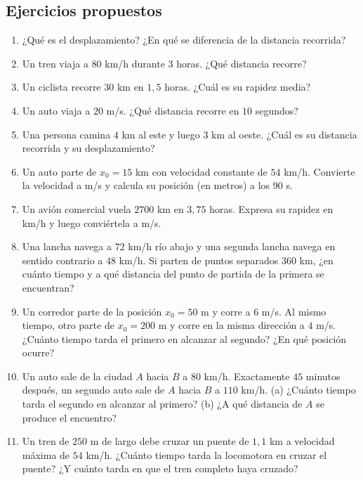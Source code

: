 \documentclass[12pt, letterpaper]{article}
\begin{document}
\subsection{Ejercicios propuestos}

\begin{enumerate}[leftmargin=*, resume]
  \item \facil{} ¿Qué es el desplazamiento? ¿En qué se diferencia de la distancia recorrida?

  \item \facil{} Un tren viaja a $80$ km/h durante $3$ horas. ¿Qué distancia recorre?

  \item \facil{} Un ciclista recorre $30$ km en $1{,}5$ horas. ¿Cuál es su rapidez media?

  \item \facil{} Un auto viaja a $20$ m/s. ¿Qué distancia recorre en $10$ segundos?

  \item \facil{} Una persona camina $4$ km al este y luego $3$ km al oeste. ¿Cuál es su distancia recorrida y su desplazamiento?

  \item \medio{} Un auto parte de $x_0 = 15$ km con velocidad constante de $54$ km/h. Convierte la velocidad a m/s y calcula su posición (en metros) a los $90$ s.

  \item \medio{} Un avión comercial vuela $2700$ km en $3{,}75$ horas. Expresa su rapidez en km/h y luego conviértela a m/s.

  \item \medio{} Una lancha navega a $72$ km/h río abajo y una segunda lancha navega en sentido contrario a $48$ km/h. Si parten de puntos separados $360$ km, ¿en cuánto tiempo y a qué distancia del punto de partida de la primera se encuentran?

  \item \medio{} Un corredor parte de la posición $x_0 = 50$ m y corre a $6$ m/s. Al mismo tiempo, otro parte de $x_0 = 200$ m y corre en la misma dirección a $4$ m/s. ¿Cuánto tiempo tarda el primero en alcanzar al segundo? ¿En qué posición ocurre?

  \item \dificil{} Un auto sale de la ciudad $A$ hacia $B$ a $80$ km/h. Exactamente $45$ minutos después, un segundo auto sale de $A$ hacia $B$ a $110$ km/h. (a) ¿Cuánto tiempo tarda el segundo en alcanzar al primero? (b) ¿A qué distancia de $A$ se produce el encuentro?

  \item \dificil{} Un tren de $250$ m de largo debe cruzar un puente de $1{,}1$ km a velocidad máxima de $54$ km/h. ¿Cuánto tiempo tarda la locomotora en cruzar el puente? ¿Y cuánto tarda en que el tren completo haya cruzado?
\end{enumerate}
\end{document}
